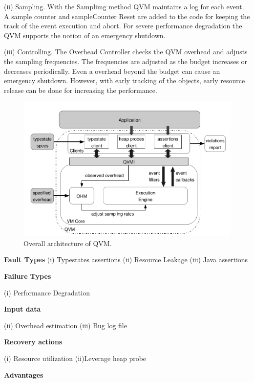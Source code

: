 \begin{compactitem}
(ii) Sampling. With the Samplimg method QVM maintains a log for each event. A sample counter and sampleCounter Reset are added to the code for keeping the track of the event execution and abort. For severe performance degradation the QVM supports the notion of an emergency shutdown.

(iii)	Controlling. The Overhead Controller checks the QVM overhead and adjusts the sampling frequencies. The frequencies are adjusted as the budget increases or decreases periodically. Even a overhead beyond the budget can cause an emergency shutdown.
However, with early tracking of the objects, early resource release can be done for increasing the performance. 

\begin{figure}[H]
\center
\includegraphics[width=5in]{img/qvm}
\caption{Overall architecture of QVM.}
\end{figure}

\item[\textbf{Fault Types}]
(i)	Typestates assertions
(ii)	Resource Leakage
(iii)	Java assertions
 
\item[\textbf{Failure Types}]

(i)	Performance Degradation

\item[\textbf{Input data}] 

(ii)	Overhead estimation
(iii)	Bug log file


\item[\textbf{Recovery actions}]

(i)	Resource utilization
(ii)Leverage heap probe 


\item[\textbf{Advantages}] 


\end{compactitem}
